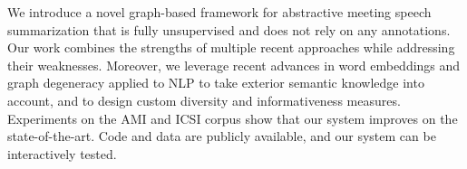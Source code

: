 We introduce a novel graph-based framework for abstractive meeting speech summarization that is fully unsupervised and does not rely on any annotations. Our work combines the strengths of multiple recent approaches while addressing their weaknesses. Moreover, we leverage recent advances in word embeddings and graph degeneracy applied to NLP to take exterior semantic knowledge into account, and to design custom diversity and informativeness measures. Experiments on the AMI and ICSI  corpus show that our system improves on the state-of-the-art. Code and data are publicly available, and our system can be interactively tested.

